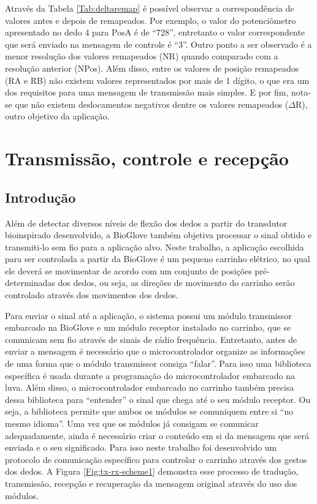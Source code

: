 \documentclass[
	12pt,				%
	openright,			%
	oneside,			%
	a4paper,			%
	english,			%
	brazil				%
	]{abntex2}
\begin{document}
		Através da Tabela \ref{Tab:deltaremap} é possível observar a correspondência de valores antes e depois de remapeados. Por exemplo, o valor do potenciômetro apresentado no dedo 4 para PosA é de ``728'', entretanto o valor correspondente que será enviado na mensagem de controle é ``3''. Outro ponto a ser observado é a menor resolução dos valores remapeados (NR) quando comparado com a resolução anterior (NPos). Além disso, entre os valores de posição remapeados (RA e RB) não existem valores representados por mais de 1 dígito, o que era um dos requisitos para uma mensagem de transmissão mais simples. E por fim, nota-se que não existem deslocamentos negativos dentre os valores remapeados ($\Delta$R), outro objetivo da aplicação.

	
		\section{Transmissão, controle e recepção}

		\subsection{Introdução}

		Além de detectar diversos níveis de flexão dos dedos a partir do transdutor bioinspirado desenvolvido, a BioGlove também objetiva processar o sinal obtido e transmiti-lo sem fio para a aplicação alvo. Neste trabalho, a aplicação escolhida para ser controlada a partir da BioGlove é um pequeno carrinho elétrico, no qual ele deverá se movimentar de acordo com um conjunto de posições pré-determinadas dos dedos, ou seja, as direções de movimento do carrinho serão controlado através dos movimentos dos dedos.

		Para enviar o sinal até a aplicação, o sistema possui um módulo transmissor embarcado na BioGlove e um módulo receptor instalado no carrinho, que se comunicam sem fio através de sinais de rádio frequência. Entretanto, antes de enviar a mensagem é necessário que o microcontrolador organize as informações de uma forma que o módulo transmissor consiga ``falar''. Para isso uma biblioteca específica é usada durante a programação do microcontrolador embarcado na luva. Além disso, o microcontrolador embarcado no carrinho também precisa dessa biblioteca para ``entender'' o sinal que chega até o seu módulo receptor. Ou seja, a biblioteca permite que ambos os módulos se comuniquem entre si ``no mesmo idioma''. Uma vez que os módulos já consigam se comunicar adequadamente, ainda é necessário criar o conteúdo em si da mensagem que será enviada e o seu significado. Para isso neste trabalho foi desenvolvido um protocolo de comunicação específico para controlar o carrinho através dos gestos dos dedos. A Figura \ref{Fig:tx-rx-scheme1} demonstra esse processo de tradução, transmissão, recepção e recuperação da mensagem original através do uso dos módulos.
\end{document}
